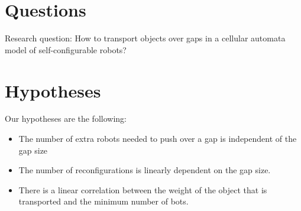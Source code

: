 \documentclass{article}
\begin{document}
\section{Questions}
Research question: How to transport objects over gaps in a cellular automata model of self-configurable robots?

\section{Hypotheses}
Our hypotheses are the following:
\begin{itemize}
 \item The number of extra robots needed to push over a gap is independent of the gap size
 \item The number of reconfigurations is linearly dependent on the gap size.
 \item There is a linear correlation between the weight of the object that is transported and the minimum number of bots.
\end{itemize}



\end{document}
